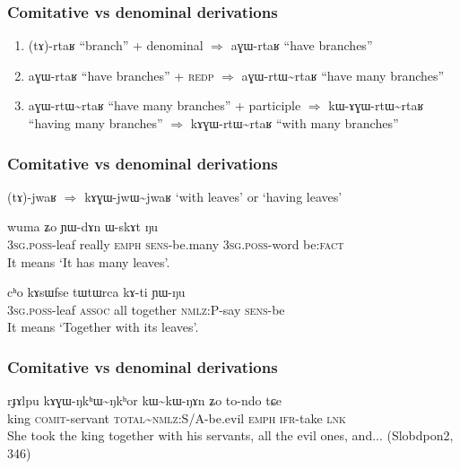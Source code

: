 \documentclass[xcolor=table]{beamer}
\newcommand{\ipa}[1]{{\phon \mbox{#1}}} %
\begin{document}
 
      \begin{frame} 
\frametitle{Comitative vs denominal derivations} 
 
 \begin{enumerate}
\item \ipa{(tɤ)-rtaʁ} ``branch'' + denominal $\Rightarrow$  \ipa{aɣɯ-rtaʁ} ``have branches''
\item  \ipa{aɣɯ-rtaʁ} ``have branches'' + \textsc{redp} $\Rightarrow$  \ipa{aɣɯ-rtɯ\textasciitilde{}rtaʁ} ``have many branches'' 
\item \ipa{aɣɯ-rtɯ\textasciitilde{}rtaʁ} ``have many branches'' + participle $\Rightarrow$  \ipa{kɯ-ɤɣɯ-rtɯ\textasciitilde{}rtaʁ} ``having many branches''  $\Rightarrow$ \ipa{kɤɣɯ-rtɯ\textasciitilde{}rtaʁ} ``with many branches'' 
\end{enumerate}
 \end{frame}   
 
\begin{frame} 
\frametitle{Comitative vs denominal derivations} 
 
\ipa{(tɤ)-jwaʁ} $\Rightarrow$ \ipa{kɤɣɯ-jwɯ\textasciitilde{}jwaʁ} `with leaves' or `having leaves'
 
\begin{exe}
\ex
\gll  \ipa{ɯ-jwaʁ} 	\ipa{wuma} 	\ipa{ʑo} 	\ipa{ɲɯ-dɤn} 	\ipa{ɯ-skɤt} 	\ipa{ŋu} \\
\textsc{3sg.poss}-leaf really \textsc{emph} \textsc{sens}-be.many \textsc{3sg.poss}-word be:\textsc{fact} \\
\glt It means `It has many leaves'.
\end{exe}  

\begin{exe}
\ex
\gll \ipa{ɯ-jwaʁ} 	\ipa{cʰo} 	\ipa{kɤsɯfse} 	\ipa{tɯtɯrca} 	\ipa{kɤ-ti} 	\ipa{ɲɯ-ŋu} 
 \\
\textsc{3sg.poss}-leaf \textsc{assoc} all together \textsc{nmlz}:P-say \textsc{sens}-be  \\
\glt It means `Together with its leaves'.
\end{exe}  

 \end{frame}    

\begin{frame} 
\frametitle{Comitative vs denominal derivations} 

\begin{exe}
\ex
\gll 
\ipa{rɟɤlpu} 	\ipa{kɤɣɯ-ŋkʰɯ\textasciitilde{}ŋkʰor} 	\ipa{kɯ\textasciitilde{}kɯ-ŋɤn} 	\ipa{ʑo} 	\ipa{to-ndo} 	\ipa{tɕe} \\
king \textsc{comit}-servant \textsc{total}\textasciitilde{}\textsc{nmlz}:S/A-be.evil \textsc{emph} \textsc{ifr}-take \textsc{lnk} \\
\glt She took the king together with his servants, all the evil ones, and... (Slobdpon2, 346)
\end{exe}  
  \end{frame}    
\end{document}
